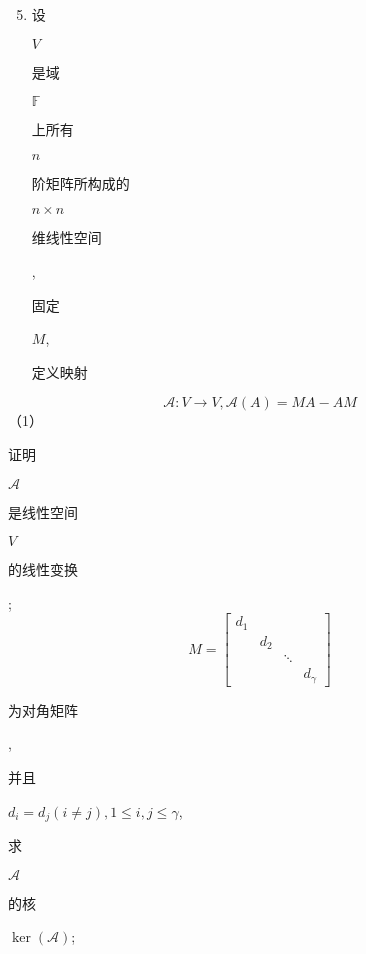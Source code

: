 \documentclass[10pt]{article}
\begin{document}
\begin{enumerate}
  \setcounter{enumi}{4}
  \item \begin{CJK}{UTF8}{mj}设\end{CJK} $V$ \begin{CJK}{UTF8}{mj}是域\end{CJK} $\mathbb{F}$ \begin{CJK}{UTF8}{mj}上所有\end{CJK} $n$ \begin{CJK}{UTF8}{mj}阶矩阵所构成的\end{CJK} $n \times n$ \begin{CJK}{UTF8}{mj}维线性空间\end{CJK}, \begin{CJK}{UTF8}{mj}固定\end{CJK} $M$, \begin{CJK}{UTF8}{mj}定义映射\end{CJK}
\end{enumerate}
$$
\mathscr{A}: V \rightarrow V, \mathscr{A}(A)=M A-A M
$$
（1）\begin{CJK}{UTF8}{mj}证明\end{CJK} $\mathscr{A}$ \begin{CJK}{UTF8}{mj}是线性空间\end{CJK} $V$ \begin{CJK}{UTF8}{mj}的线性变换\end{CJK};
$$
M=\left[\begin{array}{cccc}
d_{1} & & & \\
& d_{2} & & \\
& & \ddots & \\
& & & d_{\gamma}
\end{array}\right]
$$
\begin{CJK}{UTF8}{mj}为对角矩阵\end{CJK}, \begin{CJK}{UTF8}{mj}并且\end{CJK} $d_{i}=d_{j}(i \neq j), 1 \leq i, j \leq \gamma$, \begin{CJK}{UTF8}{mj}求\end{CJK} $\mathscr{A}$ \begin{CJK}{UTF8}{mj}的核\end{CJK} $\operatorname{ker}(\mathscr{A})$;
\end{document}
